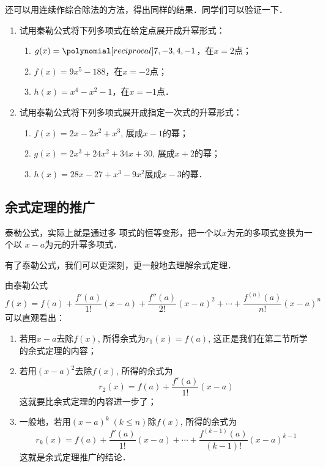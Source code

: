     还可以用连续作综合除法的方法，得出同样的结果．同学们可以验证一下．

\begin{ex}
\begin{enumerate}
    \item 试用秦勒公式将下列多项式在给定点展开成升幂形式：
\begin{enumerate}
    \item $g(x)=\poly{7,-3,4,-1}$，在$x=2$点；
    \item $f (x) =9x^5-188$，在$x=-2$点；
    \item $h(x)=x^4-x^2-1$，在$x=-1$点．
\end{enumerate}

    \item 试用泰勒公式将下列多项式展开成指定一次式的升幂形式：
\begin{enumerate}
    \item $f(x)=2x-2x^2+x^3$, 展成$x-1$的幂；
    \item $g(x)=2x^3+24x^2+34x+30$, 展成$x+2$的幂；
    \item $h(x)=28x-27+x^3-9x^2$展成$x-3$的幂．
\end{enumerate} 
\end{enumerate}
\end{ex}
    
\subsection{余式定理的推广}

泰勒公式，实际上就是通过多
项式的恒等变形，把一个以$x$为元的多项式变换为一个以
$x-a$为元的升幂多项式．

有了泰勒公式，我们可以更深刻，更一般地去理解余式定理．

由泰勒公式
\[f(x)=f(a)+\frac{f'(a)}{1!}(x-a)+\frac{f''(a)}{2!}(x-a)^2+\cdots+\frac{f^{(n)}(a)}{n!}(x-a)^n\]
可以直观看出：
\begin{enumerate}
    \item 若用$x-a$去除$f(x)$, 所得余式为$r_1(x)=f(a)$, 这正是我们在第二节所学的余式定理的内容；
    \item 若用$(x-a)^2$去除$f(x)$, 所得的余式为
    \[ r_2(x) =f (a) +\frac{f'(a)}{1!}  (x-a)\]
    这就要比余式定理的内容进一步了；
    \item 一般地，若用$(x-a)^k\; (k\le n)$除$f(x)$, 所得的余式为
    \[r_k(x)=f(a)+\frac{f'(a)}{1!}(x-a)+\cdots+\frac{f^{(k-1)}(a)}{(k-1)!}(x-a)^{k-1}\]
    这就是余式定理推广的结论．
\end{enumerate}

